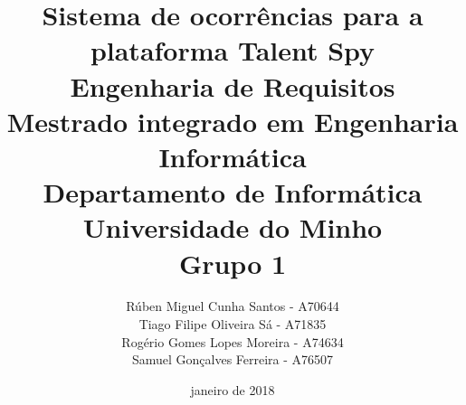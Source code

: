 \title{
	{Sistema de ocorrências para a plataforma Talent Spy}
	\vspace{7mm}
	\\{Engenharia de Requisitos}\\
	{\large Mestrado integrado em Engenharia Informática}\\
	{\large Departamento de Informática}\\
	{\large Universidade do Minho}\\
	\vspace{5mm}
	{Grupo 1}
}

\author{Rúben Miguel Cunha Santos - A70644\\
Tiago Filipe Oliveira Sá - A71835\\
Rogério Gomes Lopes Moreira - A74634\\
Samuel Gonçalves Ferreira - A76507}

\date{janeiro de 2018}
\maketitle